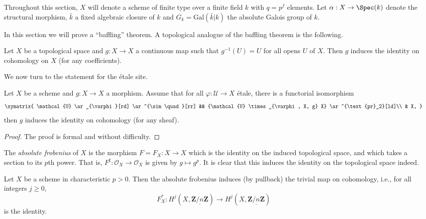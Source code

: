 \noindent
Throughout this section, $X$ will denote a scheme of finite type over a finite
field $k$ with $q = p^f$ elements. Let $\alpha : X \to \Spec(k)$ denote
the structural morphism, $\bar k$ a fixed algebraic closure of $k$ and $G_k =
\text{Gal}(\bar k | k)$ the absolute Galois group of $k$.

\medskip\noindent
In this section we will prove a ``baffling'' theorem.
A topological analogue of the baffling theorem is the following.

\begin{exercise}
\label{exercise-baffling}
Let $X$ be a topological space and $g : X \to X$ a continuous map such that
$g^{-1}(U) = U$ for all opens $U$ of $X$. Then $g$ induces the identity on
cohomology on $X$ (for any coefficients).
\end{exercise}

\noindent
We now turn to the statement for the \'etale site.

\begin{lemma}
\label{lemma-baffling}
Let $X$ be a scheme and $g : X \to X$ a morphism. Assume that for all $\varphi:
\mathcal{U} \to X$ \'etale, there is a functorial isomorphism
$$
\xymatrix{
\mathcal{U} \ar_{\varphi}[rd] \ar^{\sim \quad}[rr] && {\mathcal{U}
\times_{\varphi, X, g} X} \ar^{\text{pr}_2}[ld]\\
& X,
}
$$
then $g$ induces the identity on cohomology (for any sheaf).
\end{lemma}

\begin{proof}
The proof is formal and without difficulty.
\end{proof}

\begin{definition}
\label{definition-absolute-frobenius}
The {\it absolute frobenius} of $X$ is the morphism $F = F_X : X \to X$ which
is the identity on the induced topological space, and which takes a section to
its $p$th power. That is, $F^\sharp : \mathcal{O}_X \to \mathcal{O}_X$ is given
by $g \mapsto g^p$. It is clear that this induces the identity on the
topological space indeed.
\end{definition}

\begin{theorem}
\label{theorem-baffling}
Let $X$ be a scheme in characteristic $p>0$. Then the absolute frobenius
induces (by pullback) the trivial map on cohomology, i.e., for all
integers $j\geq 0$,
$$
F_X^* : H^j (X, \underline{\mathbf{Z}/n\mathbf{Z}}) \longrightarrow H^j (X,
\underline{\mathbf{Z}/n\mathbf{Z}})
$$
is the identity.
\end{theorem}

